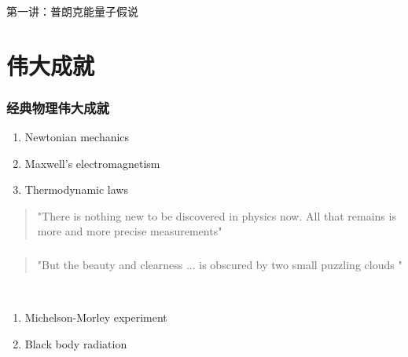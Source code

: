 \begin{frame}
    \frametitle{}
    \begin{center}
    { {\huge 第一讲：普朗克能量子假说 }}
    \end{center}    
\end{frame}

\section{伟大成就}

\begin{frame}
    \frametitle{经典物理伟大成就}
    \begin{tcolorbox3}
        \begin{enumerate}
            \item Newtonian mechanics
            \item Maxwell's electromagnetism
            \item Thermodynamic laws
        \end{enumerate}
    \end{tcolorbox3}  
    \begin{quotation}
        "There is nothing new to be discovered in physics now. All that remains is 
        more and more precise measurements"   \\
    \end{quotation}
\end{frame}

\begin{frame}
    \frametitle{}
    \begin{quotation}
        "But the beauty and clearness ... is obscured by two small puzzling clouds "  \\
    \end{quotation}
    ~~ \vspace{0.3em}
    \begin{tcolorbox3}
        [两朵乌云]    
        \begin{enumerate}
        \item Michelson-Morley experiment
        \item Black body radiation
        \end{enumerate}
        \end{tcolorbox3} 
\end{frame}


